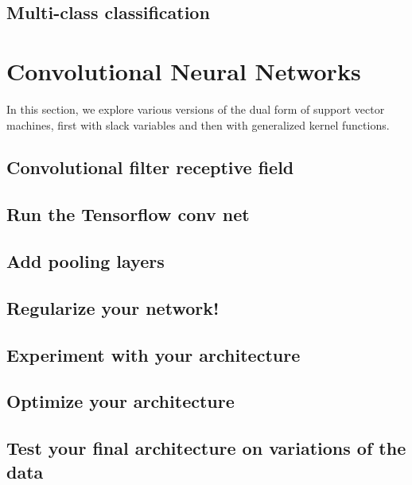 \documentclass{article}
\begin{document}
\subsection{Multi-class classification}



\section{Convolutional Neural Networks}
In this section, we explore various versions of the dual form of support vector machines, first with slack variables and then with generalized kernel functions.

\subsection{Convolutional filter receptive field}

\subsection{Run the Tensorflow conv net}

\subsection{Add pooling layers}

\subsection{Regularize your network!}

\subsection{Experiment with your architecture}

\subsection{Optimize your architecture}

\subsection{Test your final architecture on variations of the data}
\end{document}
